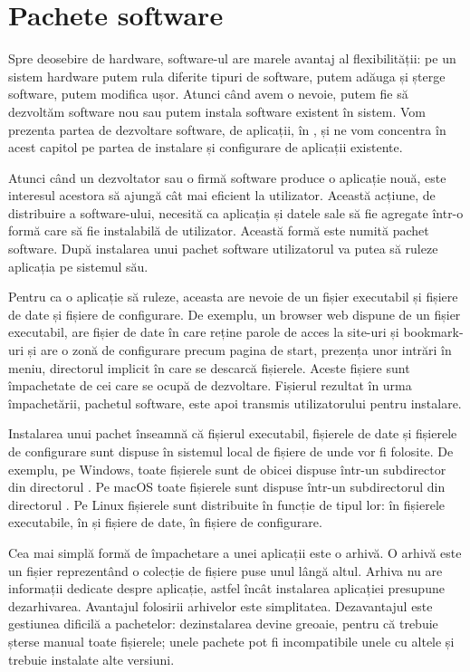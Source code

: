 \chapter{Pachete software}
\label{chapter:package}

Spre deosebire de hardware, software-ul are marele avantaj al flexibilității: pe un sistem hardware putem rula diferite tipuri de software, putem adăuga și șterge software, putem modifica ușor. Atunci când avem o nevoie, putem fie să dezvoltăm software nou sau putem instala software existent în sistem. Vom prezenta partea de dezvoltare software, de aplicații, în , și ne vom concentra în acest capitol pe partea de instalare și configurare de aplicații existente.

Atunci când un dezvoltator sau o firmă software produce o aplicație nouă, este interesul acestora să ajungă cât mai eficient la utilizator. Această acțiune, de distribuire a software-ului, necesită ca aplicația și datele sale să fie agregate într-o formă care să fie instalabilă de utilizator. Această formă este numită pachet software. După instalarea unui pachet software utilizatorul va putea să ruleze aplicația pe sistemul său.

Pentru ca o aplicație să ruleze, aceasta are nevoie de un fișier executabil și fișiere de date și fișiere de configurare. De exemplu, un browser web dispune de un fișier executabil, are fișier de date în care reține parole de acces la site-uri și bookmark-uri și are o zonă de configurare precum pagina de start, prezența unor intrări în meniu, directorul implicit în care se descarcă fișierele. Aceste fișiere sunt împachetate de cei care se ocupă de dezvoltare. Fișierul rezultat în urma împachetării, pachetul software, este apoi transmis utilizatorului pentru instalare.

Instalarea unui pachet înseamnă că fișierul executabil, fișierele de date și fișierele de configurare sunt dispuse în sistemul local de fișiere de unde vor fi folosite. De exemplu, pe Windows, toate fișierele sunt de obicei dispuse într-un subdirector din directorul . Pe macOS toate fișierele sunt dispuse într-un subdirectorul din directorul . Pe Linux fișierele sunt distribuite în funcție de tipul lor: în  fișierele executabile, în  și  fișiere de date, în  fișiere de configurare.

Cea mai simplă formă de împachetare a unei aplicații este o arhivă. O arhivă este un fișier reprezentând o colecție de fișiere puse unul lângă altul. Arhiva nu are informații dedicate despre aplicație, astfel încât instalarea aplicației presupune dezarhivarea. Avantajul folosirii arhivelor este simplitatea. Dezavantajul este gestiunea dificilă a pachetelor: dezinstalarea devine greoaie, pentru că trebuie șterse manual toate fișierele; unele pachete pot fi incompatibile unele cu altele și trebuie instalate alte versiuni.


